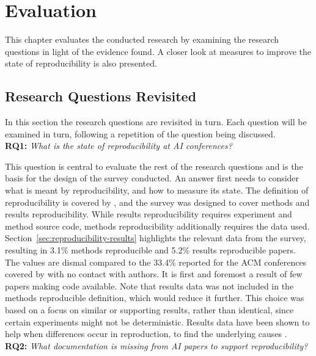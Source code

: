 
\chapter{Evaluation}
\label{chap:evaluation}
This chapter evaluates the conducted research by examining the research questions in light of the evidence found. A closer look at measures to improve the state of reproducibility is also presented.

\section{Research Questions Revisited}
\label{sec:revisit-rq}
In this section the research questions are revisited in turn. Each question will be examined in turn, following a repetition of the question being discussed.\\

\textbf{RQ1:} \emph{What is the state of reproducibility at AI conferences?}

This question is central to evaluate the rest of the research questions and is the basis for the design of the survey conducted. An answer first needs to consider what is meant by reproducibility, and how to measure its state. The definition of reproducibility is covered by \cite{Goodman341ps12}, and the survey was designed to cover methods and results reproducibility. While results reproducibility requires experiment and method source code, methods reproducibility additionally requires the data used. Section~\ref{sec:reproducibility-results} highlights the relevant data from the survey, resulting in 3.1\% methods reproducible and 5.2\% results reproducible papers. The values are dismal compared to the 33.4\% reported for the ACM conferences covered by \cite{Collberg2016} with no contact with authors. It is first and foremost a result of few papers making code available. Note that results data was not included in the methods reproducible definition, which would reduce it further. This choice was based on a focus on similar or supporting results, rather than identical, since certain experiments might not be deterministic. Results data have been shown to help when differences occur in reproduction, to find the underlying causes \citep{fokkens2013offspring}.\\

\textbf{RQ2:} \emph{What documentation is missing from AI papers to support reproducibility?}

